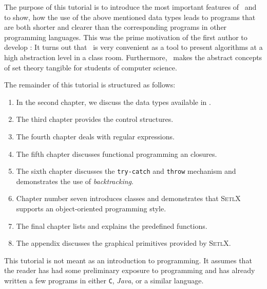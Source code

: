 The purpose of this tutorial is to introduce the most important features of \setlx\ and to
show, how the use of the above mentioned data types leads to programs that are both shorter
and clearer than the corresponding programs in other programming languages.  This was the
prime motivation of the first author to develop \setlx:  It turns out that \setlx\ is very
convenient as a tool to present algorithms at a high abstraction level in a class room. 
Furthermore, \setlx\ makes the abstract concepts of set theory tangible for students of
computer science. 
\pagebreak

\noindent 
The remainder
of this tutorial is structured as follows:
\begin{enumerate}
\item In the second chapter, we discuss the data types available in \setlx.
\item The third chapter provides the control structures.
\item The fourth chapter deals with regular expressions.
\item The fifth chapter discusses functional programming an closures.
\item The sixth chapter discusses the \texttt{try-}\texttt{catch} and \texttt{throw}
      mechanism and demonstrates the use of \emph{backtracking}.
\item Chapter number seven introduces classes and demonstrates that \textsc{SetlX}
         supports an object-oriented programming style.
\item The final chapter lists and explains the predefined functions.
\item The appendix discusses the graphical primitives provided by \textsc{SetlX}.
\end{enumerate}
This tutorial is not meant as an introduction to programming.  It assumes that the reader
has had some preliminary exposure to programming and has already written a few programs in
either \texttt{C}, \textsl{Java}, or a similar language.

